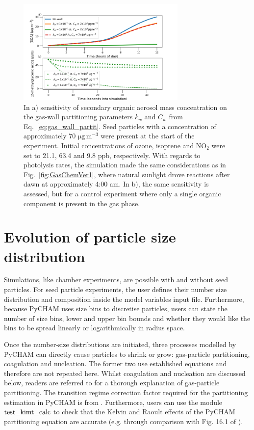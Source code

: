 \documentclass[gmd, manuscript]{copernicus}
\begin{document}
\begin{figure}[t]
\includegraphics[width=8.3cm]{Results/Gaswall_sens_fig.png}
\caption{In a) sensitivity of secondary organic aerosol mass concentration on the gas-wall partitioning parameters $k_{w}$ and $C_{w}$ from Eq.~\ref{eq:gas_wall_partit}.  Seed particles with a concentration of approximately 70 $\mathrm{\mu g\, m^{-3}}$ were present at the start of the experiment.  Initial concentrations of ozone, isoprene and $\mathrm{NO_{2}}$ were set to 21.1, 63.4 and 9.8 ppb, respectively.  With regards to photolysis rates, the simulation made the same considerations as in Fig.~\ref{fig:GasChemVer1}, where natural sunlight drove reactions after dawn at approximately 4:00 am.  In b), the same sensitivity is assessed, but for a control experiment where only a single organic component is present in the gas phase.}
\label{fig:Gaswall_sens_fig}
\end{figure}

\section{Evolution of particle size distribution}

Simulations, like chamber experiments, are possible with and without seed particles.  For seed particle experiments, the user defines their number size distribution and composition inside the model variables input file.  Furthermore, because PyCHAM uses size bins to discretise particles, users can state the number of size bins, lower and upper bin bounds and whether they would like the bins to be spread linearly or logarithmically in radius space.  

Once the number-size distributions are initiated, three processes modelled by PyCHAM can directly cause particles to shrink or grow: gas-particle partitioning, coagulation and nucleation.  The former two use established equations and therefore are not repeated here.  Whilst coagulation and nucleation are discussed below, readers are referred to \citet{Zaveri2008} for a thorough explanation of gas-particle partitioning.  The transition regime correction factor required for the partitioning estimation in PyCHAM is from \citet{Fuchs1971}.  Furthermore, users can use the module $\rm{test\_kimt\_calc}$ to check that the Kelvin and Raoult effects of the PyCHAM partitioning equation are accurate (e.g. through comparison with Fig. 16.1 of \citet{Jacobson2005}).
\end{document}
